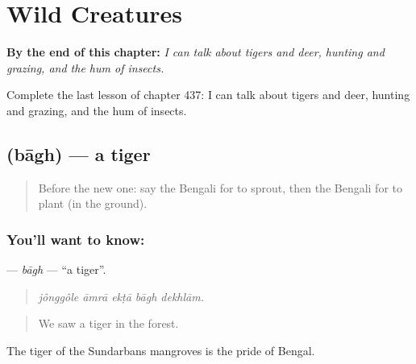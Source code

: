 
\chapter{Wild Creatures}
\label{ch:bn-wild-creatures}

\begin{chapteropening}
\textbf{By the end of this chapter:} \emph{I can talk about tigers and deer, hunting and grazing, and the hum of insects.}

Complete the last lesson of chapter 437: I can talk about tigers and deer, hunting and grazing, and the hum of insects.
\end{chapteropening}

\section[\texorpdfstring{\bn{বাঘ} (bāgh)}{বাঘ (bāgh)}]{ (bāgh) — a tiger}

\label{lesson:BN-C437-bagh}



\begin{quote}
Before the new one: say the Bengali for to sprout, then the Bengali for to plant (in the ground).
\end{quote}

\subsection*{You'll want to know: }
\textbf{} — \emph{bāgh} — \textquotedblleft{}a tiger\textquotedblright{}.

\begin{quote}
    
\end{quote}

\begin{quote}
\emph{jônggôle āmrā ekṭā bāgh dekhlām.}
\end{quote}

\begin{quote}
We saw a tiger in the forest.
\end{quote}

The tiger of the Sundarbans mangroves is the pride of Bengal.

